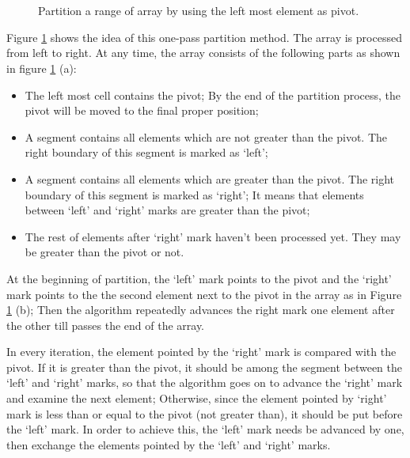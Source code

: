 \documentclass[UTF8]{article}
\begin{document}
\begin{figure}[htbp]
   \centering
    \\
    \\
   \caption{Partition a range of array by using the left most element as pivot.}
   \label{fig:partition-1-way}
\end{figure}

Figure \ref{fig:partition-1-way} shows the idea of this one-pass partition method. The array is processed from
left to right. At any time, the array consists of the following parts as shown in figure \ref{fig:partition-1-way} (a):

\begin{itemize}
\item The left most cell contains the pivot; By the end of the partition process, the pivot will be moved to the
final proper position;
\item A segment contains all elements which are not greater than the pivot. The right boundary of this segment is
marked as `left';
\item A segment contains all elements which are greater than the pivot. The right boundary of this segment is marked
as `right'; It means that elements between `left' and `right' marks are greater than the pivot;
\item The rest of elements after `right' mark haven't been processed yet. They may be greater than the
pivot or not.
\end{itemize}

At the beginning of partition, the `left' mark points to the pivot and the `right' mark points to the
the second element next to the pivot in the array as in Figure
\ref{fig:partition-1-way} (b); Then the algorithm repeatedly advances the right mark one element after the other
till passes the end of the array.

In every iteration, the element pointed by the `right' mark is compared with the
pivot. If it is greater than the pivot, it should be among the segment between the `left' and `right' marks, so that
the algorithm goes on to advance the `right' mark and examine the next element; Otherwise, since the element pointed
by `right' mark is less than or equal to the pivot (not greater than), it should be put before the `left' mark.
In order to achieve this, the `left' mark needs be advanced by one, then exchange the elements pointed by the `left'
and `right' marks.
\end{document}
